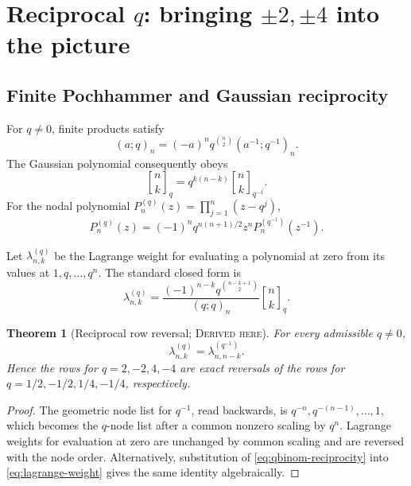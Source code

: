 \documentclass[11pt,oneside]{article}
\newtheorem{theorem}{Theorem}[section]
\theoremstyle{definition}
\theoremstyle{remark}
\newcommand{\qbinom}[3]{\genfrac{[}{]}{0pt}{}{#1}{#2}_{#3}}
\newcommand{\Derived}{\textsc{Derived here}}
\begin{document}
\section{Reciprocal \texorpdfstring{\(q\)}{q}: bringing \texorpdfstring{\(\pm2,\pm4\)}{+/-2,+/-4} into the picture}

\subsection{Finite Pochhammer and Gaussian reciprocity}
For \(q\ne0\), finite products satisfy
\begin{equation}\label{eq:poch-reciprocity}
 (a;q)_n=(-a)^nq^{\binom n2}(a^{-1};q^{-1})_n.
\end{equation}
The Gaussian polynomial consequently obeys
\begin{equation}\label{eq:qbinom-reciprocity}
 \qbinom{n}{k}{q}=q^{k(n-k)}\qbinom{n}{k}{q^{-1}}.
\end{equation}
For the nodal polynomial
\(P_n^{(q)}(z)=\prod_{j=1}^n(z-q^j)\),
\begin{equation}\label{eq:nodal-reciprocity}
 P_n^{(q)}(z)=(-1)^nq^{n(n+1)/2}z^nP_n^{(q^{-1})}(z^{-1}).
\end{equation}

Let \(\lambda_{n,k}^{(q)}\) be the Lagrange weight for evaluating a polynomial
at zero from its values at \(1,q,\ldots,q^n\).  The standard closed form is
\begin{equation}\label{eq:lagrange-weight}
 \lambda_{n,k}^{(q)}
 =\frac{(-1)^{n-k}q^{\binom{n-k+1}{2}}}{(q;q)_n}
 \qbinom{n}{k}{q}.
\end{equation}

\begin{theorem}[Reciprocal row reversal; \Derived]\label{thm:lagrange-reversal}
For every admissible \(q\ne0\),
\begin{equation}\label{eq:lagrange-reversal}
 \lambda_{n,k}^{(q)}=\lambda_{n,n-k}^{(q^{-1})}.
\end{equation}
Hence the rows for \(q=2,-2,4,-4\) are exact reversals of the rows for
\(q=1/2,-1/2,1/4,-1/4\), respectively.
\end{theorem}

\begin{proof}
The geometric node list for \(q^{-1}\), read backwards, is
\(q^{-n},q^{-(n-1)},\ldots,1\), which becomes the \(q\)-node list after a common
nonzero scaling by \(q^n\).  Lagrange weights for evaluation at zero are
unchanged by common scaling and are reversed with the node order.  Alternatively,
substitution of \eqref{eq:qbinom-reciprocity} into
\eqref{eq:lagrange-weight} gives the same identity algebraically.
\end{proof}
\end{document}
